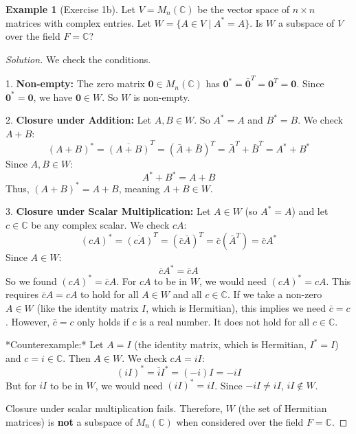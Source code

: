 \documentclass[11pt]{article}
\theoremstyle{definition}
\newtheorem{example}[theorem]{Example}
\theoremstyle{remark}
\newcommand{\zerovec}{\mathbf{0}}
\begin{document}
\begin{example}[Exercise 1b]
Let $V = M_n(\mathbb{C})$ be the vector space of $n \times n$ matrices with complex entries. Let $W = \{ A \in V \mid A^* = A \}$. Is $W$ a subspace of $V$ over the field $F=\mathbb{C}$?

\begin{proof}[Solution]
We check the conditions.

1.  \textbf{Non-empty:} The zero matrix $\zerovec \in M_n(\mathbb{C})$ has $\zerovec^* = \bar{\zerovec}^T = \zerovec^T = \zerovec$. Since $\zerovec^* = \zerovec$, we have $\zerovec \in W$. So $W$ is non-empty.

2.  \textbf{Closure under Addition:} Let $A, B \in W$. So $A^*=A$ and $B^*=B$. We check $A+B$:
    \[ (A+B)^* = \overline{(A+B)}^T = (\bar{A} + \bar{B})^T = \bar{A}^T + \bar{B}^T = A^* + B^* \]
    Since $A, B \in W$:
    \[ A^* + B^* = A + B \]
    Thus, $(A+B)^* = A+B$, meaning $A+B \in W$.

3.  \textbf{Closure under Scalar Multiplication:} Let $A \in W$ (so $A^* = A$) and let $c \in \mathbb{C}$ be any complex scalar. We check $cA$:
    \[ (cA)^* = \overline{(cA)}^T = (\bar{c} \bar{A})^T = \bar{c} (\bar{A}^T) = \bar{c} A^* \]
    Since $A \in W$:
    \[ \bar{c} A^* = \bar{c} A \]
    So we found $(cA)^* = \bar{c} A$. For $cA$ to be in $W$, we would need $(cA)^* = cA$. This requires $\bar{c} A = cA$ to hold for all $A \in W$ and all $c \in \mathbb{C}$. If we take a non-zero $A \in W$ (like the identity matrix $I$, which is Hermitian), this implies we need $\bar{c} = c$. However, $\bar{c} = c$ only holds if $c$ is a real number. It does not hold for all $c \in \mathbb{C}$.

    *Counterexample:* Let $A = I$ (the identity matrix, which is Hermitian, $I^* = I$) and $c = i \in \mathbb{C}$. Then $A \in W$. We check $cA = iI$:
    \[ (iI)^* = \bar{i} I^* = (-i) I = -iI \]
    But for $iI$ to be in $W$, we would need $(iI)^* = iI$. Since $-iI \neq iI$, $iI \notin W$.

Closure under scalar multiplication fails. Therefore, $W$ (the set of Hermitian matrices) is \textbf{not} a subspace of $M_n(\mathbb{C})$ when considered over the field $F=\mathbb{C}$.
\end{proof}
\end{example}
\end{document}
